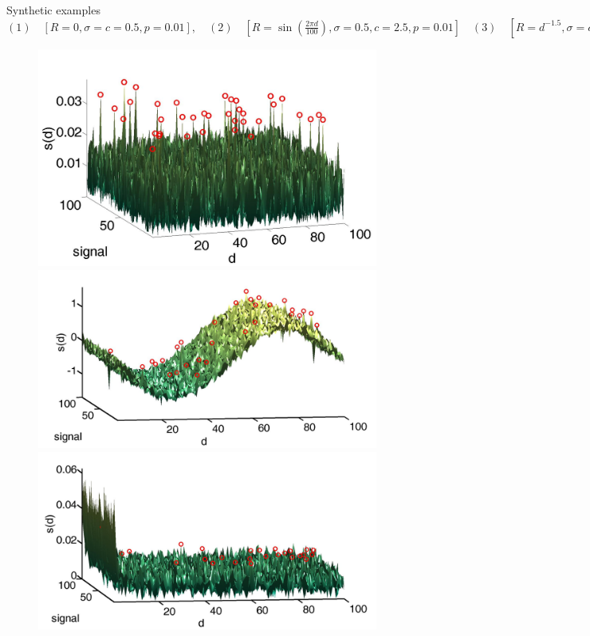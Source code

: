 \documentclass[8pt]{beamer}
\begin{document}
\begin{frame}{Synthetic examples}
\scriptsize{$(1)\quad[R=0,\sigma= c =0.5,p=0.01],\quad (2)\quad[R= \sin(\frac{2\pi d}{100}),\sigma=0.5, c=2.5,p=0.01] \quad (3)\quad[R=d^{-1.5},\sigma= c =0.5,p=0.01]$}
\begin{figure}[H]
\includegraphics[scale=0.07]{randSignalSurfaceWithPeaks} %
\includegraphics[scale=0.07]{sineSignalSurfaceWithPeaks} %
\includegraphics[scale=0.07]{gaussianChainSignalSurfaceWithPeaks} %

\end{figure}
\end{frame}
\end{document}
